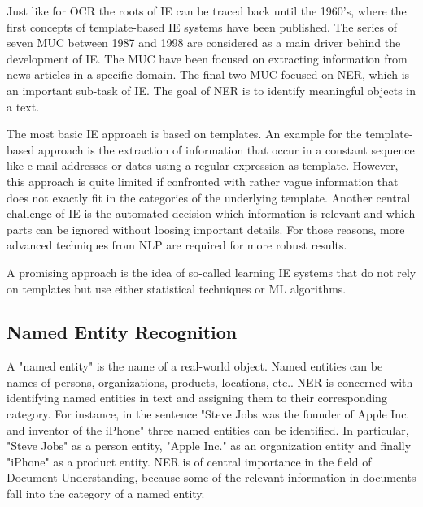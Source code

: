 Just like for \ac{OCR} the roots of \ac{IE} can be traced back until the 1960's, where the first concepts of template-based \ac{IE} systems have been published. The series of seven \ac{MUC} between 1987 and 1998 are considered as a main driver behind the development of \ac{IE}. The \ac{MUC} have been focused on extracting information from news articles in a specific domain. The final two \acs{MUC} focused on \acf{NER}, which is an important sub-task of \ac{IE}. The goal of \ac{NER} is to identify meaningful objects in a text.
\cite{hobbs2010information,cowie1996information,black1998facile}

The most basic \ac{IE} approach is based on templates. An example for the template-based approach is the extraction of information that occur in a constant sequence like e-mail addresses or dates using a regular expression as template. However, this approach is quite limited if confronted with rather vague information that does not exactly fit in the categories of the underlying template. Another central challenge of \acf{IE} is the automated decision which information is relevant and which parts can be ignored without loosing important details. For those reasons, more advanced techniques from \ac{NLP} are required for more robust results.
\cite{Wilks1997InformationEA,cowie1996information}

A promising approach is the idea of so-called learning \acf{IE} systems that do not rely on  templates but use either statistical techniques or \ac{ML} algorithms. 
\cite{hobbs2010information,cardie1997empirical}

\subsection{Named Entity Recognition}
A "named entity" is the name of a real-world object. Named entities can be names of persons, organizations, products, locations, etc..
\acf{NER} is concerned with identifying named entities in text and assigning them to their corresponding category. For instance, in the sentence "Steve Jobs was the founder of Apple Inc. and inventor of the iPhone" three named entities can be identified. In particular, "Steve Jobs" as a person entity, "Apple Inc." as an organization entity and finally "iPhone" as a product entity. \ac{NER} is of central importance in the field of Document Understanding, because some of the relevant information in documents fall into the category of a named entity. \cite{hobbs2010information,black1998facile}

